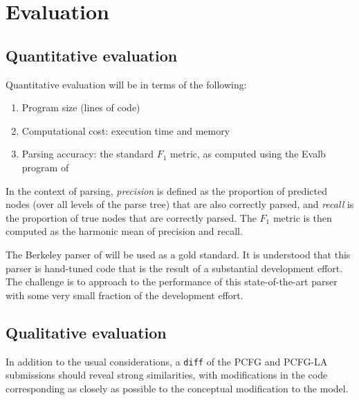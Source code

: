 \documentclass[english]{article}
\begin{document}
\section{Evaluation}

\subsection{Quantitative evaluation}

Quantitative evaluation will be in terms of the following:
\begin{enumerate}
\item Program size (lines of code)
\item Computational cost: execution time and memory
\item Parsing accuracy: the standard $F_{1}$ metric, as computed using the Evalb program of \citet{Sekine1997}
\end{enumerate}

In the context of parsing, \emph{precision} is defined as the proportion of predicted nodes (over all levels of the parse tree) that are also correctly parsed, and \emph{recall} is the proportion of true nodes that are correctly parsed. The $F_{1}$ metric is then computed as the harmonic mean of precision and recall.

The Berkeley parser of \citet{Petrov} will be used as a gold standard. It is understood that this parser is hand-tuned code that is the result of a substantial development effort. The challenge is to approach to the performance of this state-of-the-art parser with some very small fraction of the development effort.

\subsection{Qualitative evaluation}

In addition to the usual considerations, a \texttt{diff} of the PCFG and PCFG-LA submissions should reveal strong similarities, with modifications in the code corresponding as closely as possible to the conceptual modification to the model. 


 
\end{document}
